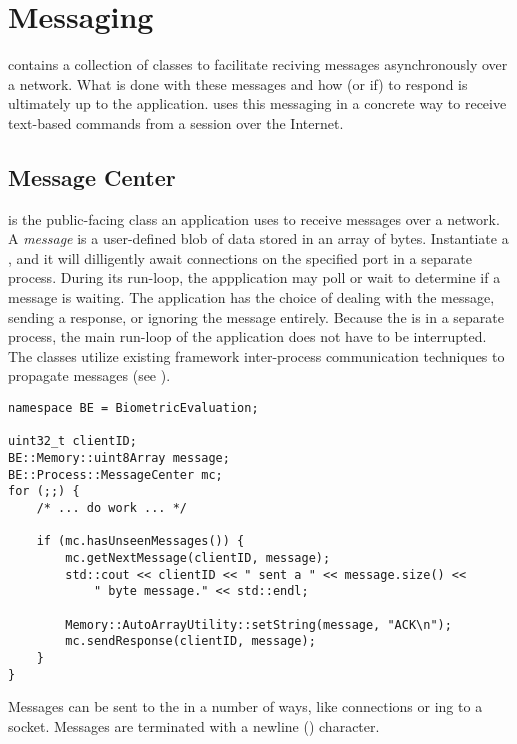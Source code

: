 %
%
\chapter{Messaging}
\label{chp_messaging}

\lname contains a collection of classes to facilitate reciving messages 
asynchronously over a network. What is done with these messages and how (or if)
to respond is ultimately up to the application. \sname uses this messaging in
a concrete way to receive text-based commands from a  session
over the Internet.

\section{Message Center}
\label{sec_mesaging_message-center}

 is the public-facing class
an application uses to receive messages over a network. A \textit{message} 
is a user-defined blob of data stored in an array of bytes.  Instantiate
a , and it will dilligently await connections on the
specified port in a separate process. During its run-loop, the appplication
may poll or wait to determine if a message is waiting. The application has
the choice of dealing with the message, sending a response, or ignoring the
message entirely. Because the  is in a separate
process, the main run-loop of the application does not have to be interrupted.
The  classes utilize existing framework inter-process
communication techniques to propagate messages (see
).

\begin{lstlisting}[caption={Basic \class{MessageCenter} Usage}, label=lst:message-center]
namespace BE = BiometricEvaluation;

uint32_t clientID;
BE::Memory::uint8Array message;
BE::Process::MessageCenter mc;
for (;;) {
	/* ... do work ... */

	if (mc.hasUnseenMessages()) {
		mc.getNextMessage(clientID, message);
		std::cout << clientID << " sent a " << message.size() <<
		    " byte message." << std::endl;

		Memory::AutoArrayUtility::setString(message, "ACK\n");
		mc.sendResponse(clientID, message);
	}
}
\end{lstlisting}

Messages can be sent to the  in a number of ways, like
 connections or ing to a socket. Messages are
terminated with a newline () character.

